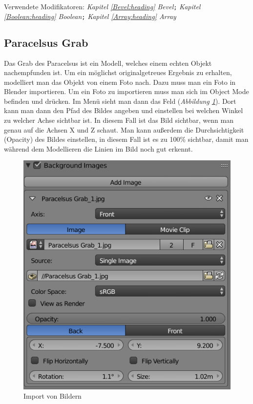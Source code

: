 Verwendete Modifikatoren: \textit{Kapitel \ref{Bevel:heading} \dq Bevel\dq}\verb+;+ \textit{Kapitel \ref{Boolean:heading} \dq Boolean\dq}\verb+;+ \textit{Kapitel \ref{Array:heading} \dq Array\dq}

\subsection{Paracelsus Grab}
\label{paracelsusgrab:ref1}
Das Grab des Paracelsus ist ein Modell, welches einem echten Objekt nachempfunden ist. Um ein möglichst originalgetreues Ergebnis zu erhalten,
modelliert man das Objekt von einem Foto nach. Dazu muss man ein Foto in Blender importieren. Um ein Foto zu importieren muss man sich im Object Mode befinden und 
drücken. Im Menü sieht man dann das Feld  (\textit{Abbildung \ref{Paracelsus_Grab:image1}}). Dort kann man dann den Pfad des Bildes angeben
und einstellen bei welchen Winkel zu welcher Achse sichtbar ist. In diesem Fall ist das Bild sichtbar, wenn man genau auf die Achsen X und Z schaut. Man kann außerdem die
Durchsichtigkeit (Opacity) des Bildes einstellen, in diesem Fall ist es zu 100\% sichtbar, damit man während dem Modellieren die Linien im Bild noch gut erkennt.

\raggedbottom
\begin{figure}[H]
    \centering
    \includegraphics[width=.8\textwidth]{images/Paracelsus-Grab_Import-von-Bildern.png}
    \caption{Import von Bildern}
    \label{Paracelsus_Grab:image1}
\end{figure}

